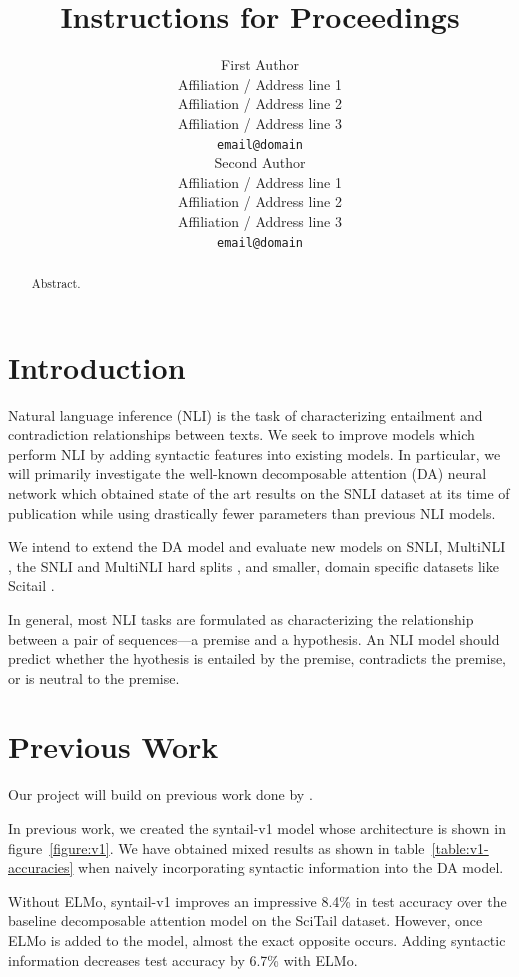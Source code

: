 \documentclass[11pt,a4paper]{article}
\title{Instructions for \confname{} Proceedings}
\author{First Author \\
  Affiliation / Address line 1 \\
  Affiliation / Address line 2 \\
  Affiliation / Address line 3 \\
  {\tt email@domain} \\\And
  Second Author \\
  Affiliation / Address line 1 \\
  Affiliation / Address line 2 \\
  Affiliation / Address line 3 \\
  {\tt email@domain} \\}
\date{}
\begin{document}
\maketitle
\begin{abstract}
  Abstract.
\end{abstract}

\section{Introduction}

Natural language inference (NLI) is the task of characterizing entailment and
contradiction relationships between texts.  We seek to improve models which
perform NLI by adding syntactic features into existing models. In particular,
we will primarily investigate the well-known decomposable attention (DA) neural
network \citep{Parikh2016-em} which obtained state of the art results on the
SNLI \citep{Bowman2015-is} dataset at its time of publication while using
drastically fewer parameters than previous NLI models.

We intend to extend the DA model and evaluate new models on SNLI, MultiNLI
\citep{Williams2017-uh}, the SNLI and MultiNLI hard splits
\citep{Gururangan2018-lj}, and smaller, domain specific datasets like Scitail
\citep{Khot2018-th}.

In general, most NLI tasks are formulated as characterizing the relationship
between a pair of sequences---a premise and a hypothesis. An NLI model should
predict whether the hyothesis is entailed by the premise, contradicts the
premise, or is neutral to the premise.

\section{Previous Work}

Our project will build on previous work done by \citet{Pang2018-syntail}.

In previous work, we created the syntail-v1 model whose architecture is shown
in figure~\ref{figure:v1}.  We have obtained mixed results as shown in
table~\ref{table:v1-accuracies} when naively incorporating syntactic
information into the DA model.

Without ELMo, syntail-v1 improves an impressive 8.4\% in test accuracy over the
baseline decomposable attention model on the SciTail dataset. However, once
ELMo is added to the model, almost the exact opposite occurs. Adding syntactic
information decreases test accuracy by 6.7\% with ELMo.
\end{document}
